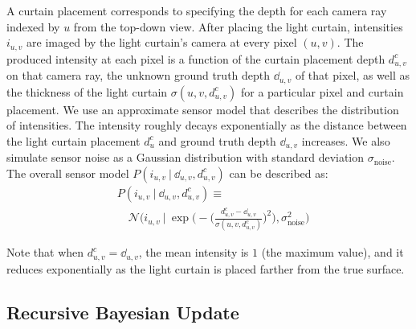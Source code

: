 A curtain placement corresponds to specifying the depth for each camera ray indexed by $u$ from the top-down view. After placing the light curtain, intensities $i_{u,v}$ are imaged by the light curtain's camera at every pixel $(u, v)$. The produced intensity at each pixel is a function of the curtain placement depth $d^c_{u, v}$ on that camera ray, the unknown ground truth depth $\dd_{u, v}$ of that pixel, as well as the thickness of the light curtain $\sigma(u, v, d^c_{u, v})$ for a particular pixel and curtain placement. We use an approximate sensor model that describes the distribution of intensities. The intensity roughly decays exponentially as the distance between the light curtain placement $d^c_u$ and ground truth depth $\dd_{u, v}$ increases.  We also simulate sensor noise as a Gaussian distribution with standard deviation $\sigma_\text{noise}$. The overall sensor model $P(i_{u, v}\ |\ \dd_{u, v}, d^c_{u, v})$ can be described as:
\begin{align}
   &\nonumber P(i_{u, v}\ |\ \dd_{u, v}, d^c_{u, v}) \equiv\\
   &\quad \mathcal{N} \Big(i_{u, v}\ |\ \exp \Big(-\Bigg(\frac{d^c_{u, v} - \dd_{u, v}}{\sigma(u, v, d^c_{u, v})}\Bigg)^2\Big), \sigma_\text{noise}^2\Big)
   \label{eqn:sensor_model}
\end{align}

Note that when $d^c_{u, v} = \dd_{u, v}$, the mean intensity is $1$ (the maximum value), and it reduces exponentially as the light curtain is placed farther from the true surface.

\subsection{Recursive Bayesian Update}
\newcommand{\qb}{q'}
\newcommand{\before}[1]{{\color{blue} P_\text{prev}(u, v, #1)}}
\newcommand{\after}[1]{{\color{red} P_\text{next}(u, v, #1)}}

